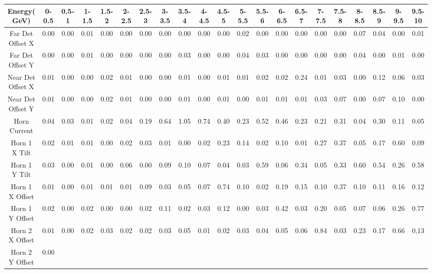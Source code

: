 \begin{table}[ht]
\centering
\tiny
\begin{tabular}{|c | c c c c c c c c c c c c c c c c c c c c | }
\hline
Energy( GeV) & 0-0.5 & 0.5-1 & 1-1.5 & 1.5-2 & 2-2.5 & 2.5-3 & 3-3.5 & 3.5-4 & 4-4.5 & 4.5-5 & 5-5.5 & 5.5-6 & 6-6.5 & 6.5-7 & 7-7.5 & 7.5-8 & 8-8.5 & 8.5-9 & 9-9.5 & 9.5-10 \\
\hline
Far Det Offset X & 0.00
 & 0.00
 & 0.01
 & 0.00
 & 0.00
 & 0.00
 & 0.00
 & 0.00
 & 0.00
 & 0.00
 & 0.02
 & 0.00
 & 0.00
 & 0.00
 & 0.00
 & 0.00
 & 0.07
 & 0.04
 & 0.00
 & 0.01
\\
Far Det Offset Y & 0.00
 & 0.00
 & 0.01
 & 0.00
 & 0.00
 & 0.00
 & 0.00
 & 0.03
 & 0.00
 & 0.00
 & 0.04
 & 0.03
 & 0.00
 & 0.00
 & 0.00
 & 0.00
 & 0.04
 & 0.00
 & 0.01
 & 0.00
\\
Near Det Offset X & 0.01
 & 0.00
 & 0.00
 & 0.02
 & 0.01
 & 0.00
 & 0.00
 & 0.01
 & 0.00
 & 0.01
 & 0.01
 & 0.02
 & 0.02
 & 0.24
 & 0.01
 & 0.03
 & 0.00
 & 0.12
 & 0.06
 & 0.03
\\
Near Det Offset Y & 0.01
 & 0.00
 & 0.00
 & 0.02
 & 0.01
 & 0.00
 & 0.00
 & 0.01
 & 0.00
 & 0.01
 & 0.00
 & 0.01
 & 0.01
 & 0.01
 & 0.03
 & 0.07
 & 0.00
 & 0.07
 & 0.10
 & 0.00
\\
Horn Current & 0.04
 & 0.03
 & 0.01
 & 0.02
 & 0.04
 & 0.19
 & 0.64
 & 1.05
 & 0.74
 & 0.40
 & 0.23
 & 0.52
 & 0.46
 & 0.23
 & 0.21
 & 0.31
 & 0.04
 & 0.30
 & 0.11
 & 0.05
\\
Horn 1 X Tilt & 0.02
 & 0.01
 & 0.01
 & 0.00
 & 0.02
 & 0.03
 & 0.01
 & 0.00
 & 0.02
 & 0.23
 & 0.14
 & 0.02
 & 0.10
 & 0.01
 & 0.27
 & 0.37
 & 0.05
 & 0.17
 & 0.60
 & 0.09
\\
Horn 1 Y Tilt & 0.03
 & 0.00
 & 0.01
 & 0.00
 & 0.06
 & 0.00
 & 0.09
 & 0.10
 & 0.07
 & 0.04
 & 0.03
 & 0.59
 & 0.06
 & 0.34
 & 0.05
 & 0.33
 & 0.60
 & 0.54
 & 0.26
 & 0.58
\\
Horn 1 X Offset & 0.01
 & 0.00
 & 0.01
 & 0.01
 & 0.01
 & 0.09
 & 0.03
 & 0.05
 & 0.07
 & 0.74
 & 0.10
 & 0.02
 & 0.19
 & 0.15
 & 0.10
 & 0.37
 & 0.10
 & 0.11
 & 0.16
 & 0.12
\\
Horn 1 Y Offset & 0.02
 & 0.00
 & 0.02
 & 0.00
 & 0.00
 & 0.02
 & 0.11
 & 0.02
 & 0.03
 & 0.12
 & 0.00
 & 0.03
 & 0.42
 & 0.03
 & 0.20
 & 0.05
 & 0.07
 & 0.06
 & 0.26
 & 0.77
\\
Horn 2 X Offset & 0.01
 & 0.00
 & 0.02
 & 0.03
 & 0.02
 & 0.02
 & 0.03
 & 0.05
 & 0.01
 & 0.02
 & 0.03
 & 0.04
 & 0.05
 & 0.06
 & 0.84
 & 0.03
 & 0.23
 & 0.17
 & 0.66
 & 0.13
\\
Horn 2 Y Offset & 0.00

\end{tabular}
\end{table}
